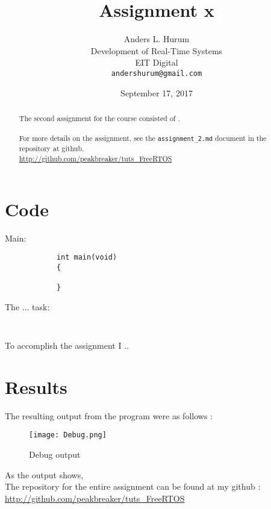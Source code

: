 \documentclass[12pt,fleqn,leqno,letterpaper]{article}
\title{Assignment x}
\author{Anders L. Hurum\\
    \small{Development of Real-Time Systems}\\
    \small{EIT Digital}\\
    \small{\texttt{andershurum@gmail.com}}
}
\date{September 17, 2017}
\begin{document}
    \maketitle

    \begin{abstract}
        
        The second assignment for the course consisted of . \\ \\
        For more details on the assignment, see the \texttt{assignment\_2.md} document 
        in the repository at github. \\
        
        \url{http://github.com/peakbreaker/tuts\_FreeRTOS}

    \end{abstract}

    \newpage

    \section*{Code}

        Main:

        \begin{verbatim}
            int main(void)
            {
                
            }
        \end{verbatim}

        The ... task:

        \begin{verbatim}
            
        \end{verbatim}

        To accomplish the assignment I ..
    \newpage
    \section*{Results}

        The resulting output from the program were as follows : \\

        \begin{figure}[h]
            \centering
            \texttt{[image: Debug.png]}
            \caption{Debug output}
            \label{figure:debug}
        \end{figure}

        As the output shows, \\
        
        The repository for the entire assignment can be found at my github : \\
        
        \url{http://github.com/peakbreaker/tuts\_FreeRTOS}

    
\end{document}
